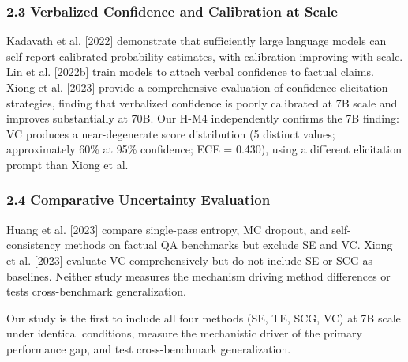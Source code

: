 \subsubsection{2.3 Verbalized Confidence and Calibration at Scale}

Kadavath et al. [2022] demonstrate that sufficiently large language models can self-report calibrated probability estimates, with calibration improving with scale. Lin et al. [2022b] train models to attach verbal confidence to factual claims. Xiong et al. [2023] provide a comprehensive evaluation of confidence elicitation strategies, finding that verbalized confidence is poorly calibrated at 7B scale and improves substantially at 70B. Our H-M4 independently confirms the 7B finding: VC produces a near-degenerate score distribution (5 distinct values; approximately 60\% at 95\% confidence; ECE = 0.430), using a different elicitation prompt than Xiong et al.

\subsubsection{2.4 Comparative Uncertainty Evaluation}

Huang et al. [2023] compare single-pass entropy, MC dropout, and self-consistency methods on factual QA benchmarks but exclude SE and VC. Xiong et al. [2023] evaluate VC comprehensively but do not include SE or SCG as baselines. Neither study measures the mechanism driving method differences or tests cross-benchmark generalization.

Our study is the first to include all four methods (SE, TE, SCG, VC) at 7B scale under identical conditions, measure the mechanistic driver of the primary performance gap, and test cross-benchmark generalization.

\begin{table}[htbp]
\centering
{}
\end{table}

